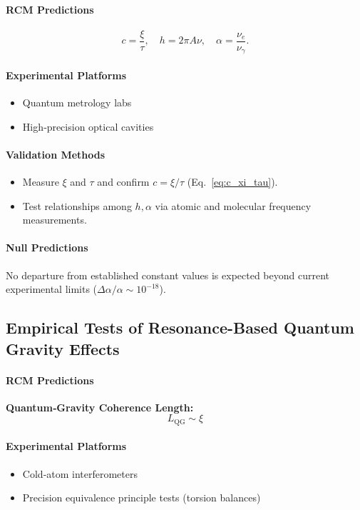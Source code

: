 \paragraph{RCM Predictions}
\[
c = \frac{\xi}{\tau},\quad
h = 2\pi A\nu,\quad
\alpha = \frac{\nu_e}{\nu_\gamma}.
\]

\paragraph{Experimental Platforms}
\begin{itemize}
  \item Quantum metrology labs  
  \item High‐precision optical cavities  
\end{itemize}

\paragraph{Validation Methods}
\begin{itemize}
  \item Measure $\xi$ and $\tau$ and confirm $c=\xi/\tau$ (Eq.~\ref{eq:c_xi_tau}).  
  \item Test relationships among $h,\alpha$ via atomic and molecular frequency measurements.
\end{itemize}

\paragraph{Null Predictions}
No departure from established constant values is expected beyond current experimental limits ($\Delta\alpha/\alpha\sim10^{-18}$).

\subsection{Empirical Tests of Resonance-Based Quantum Gravity Effects}

\paragraph{RCM Predictions}
\begin{framed}
\noindent\textbf{Quantum‐Gravity Coherence Length:}
\[
L_{\mathrm{QG}} \sim \xi
\]
\end{framed}

\paragraph{Experimental Platforms}
\begin{itemize}
  \item Cold‐atom interferometers  
  \item Precision equivalence principle tests (torsion balances)
\end{itemize}

